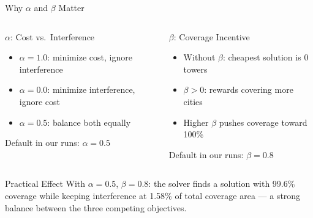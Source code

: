 \begin{frame}[t]{Why $\alpha$ and $\beta$ Matter}{}
    \begin{columns}[T]
        \begin{block}{$\alpha$: Cost vs.\ Interference}
            \begin{itemize}
                \item $\alpha = 1.0$: minimize cost, ignore interference
                \item $\alpha = 0.0$: minimize interference, ignore cost
                \item $\alpha = 0.5$: balance both equally
            \end{itemize}
            {\footnotesize Default in our runs: $\alpha = 0.5$}
        \end{block}

        \begin{block}{$\beta$: Coverage Incentive}
            \begin{itemize}
                \item Without $\beta$: cheapest solution is 0 towers
                \item $\beta > 0$: rewards covering more cities
                \item Higher $\beta$ pushes coverage toward 100\%
            \end{itemize}
            {\footnotesize Default in our runs: $\beta = 0.8$}
        \end{block}
    \end{columns}

    \vspace{0.3cm}
    \begin{alertblock}{Practical Effect}
        With $\alpha=0.5$, $\beta=0.8$: the solver finds a solution with \alert{99.6\% coverage} while keeping \alert{interference at 1.58\%} of total coverage area — a strong balance between the three competing objectives.
    \end{alertblock}
\end{frame}
